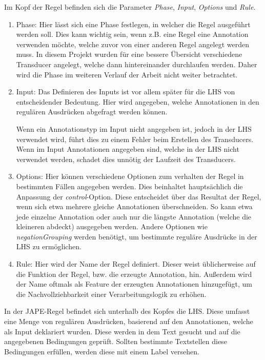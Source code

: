 \documentclass[12pt]{report}
\begin{document}
Im Kopf der Regel befinden sich die Parameter \textit{Phase}, \textit{Input}, \textit{Options} und \textit{Rule}.
 
\begin{enumerate}
\item Phase: Hier lässt sich eine Phase festlegen, in welcher die Regel ausgeführt werden soll. Dies kann wichtig sein, wenn z.B. eine Regel eine Annotation verwenden möchte, welche zuvor von einer anderen Regel angelegt werden muss. In diesem Projekt wurden für eine bessere Übersicht verschiedene Transducer angelegt, welche dann hintereinander durchlaufen werden. Daher wird die Phase im weiteren Verlauf der Arbeit nicht weiter betrachtet.

\item Input: Das Definieren des Inputs ist vor allem später für die LHS von entscheidender Bedeutung. Hier wird angegeben, welche Annotationen in den regulären Ausdrücken abgefragt werden können.

Wenn ein Annotationstyp im Input nicht angegeben ist, jedoch in der LHS verwendet wird, führt dies zu einem Fehler beim Erstellen des Transducers. Wenn im Input Annotationen angegeben sind, welche in der LHS nicht verwendet werden, schadet dies unnötig der Laufzeit des Transducers.

\item Options: Hier können verschiedene Optionen zum verhalten der Regel in bestimmten Fällen angegeben werden. Dies beinhaltet hauptsächlich die Anpassung der \textit{control}-Option. Diese entscheidet über das Resultat der Regel, wenn sich etwa mehrere gleiche Annotationen überschneiden. So kann etwa jede einzelne Annotation oder auch nur die längste Annotation (welche die kleineren abdeckt) ausgegeben werden. Andere Optionen wie \textit{negationGrouping} werden benötigt, um bestimmte reguläre Ausdrücke in der LHS zu ermöglichen.

\item Rule: Hier wird der Name der Regel definiert. Dieser weist üblicherweise auf die Funktion der Regel, bzw. die erzeugte Annotation, hin. Außerdem wird der Name oftmals als Feature der erzeugten Annotationen hinzugefügt, um die Nachvollziehbarkeit einer Verarbeitungslogik zu erhöhen. 
\end{enumerate}

In der JAPE-Regel befindet sich unterhalb des Kopfes die LHS.  Diese umfasst eine Menge von regulären Ausdrücken, basierend auf den Annotationen, welche als Input deklariert wurden. Diese werden in dem Text gesucht und auf die angegebenen Bedingungen geprüft. Sollten bestimmte Textstellen diese Bedingungen erfüllen, werden diese mit einem Label versehen. 
\end{document}

